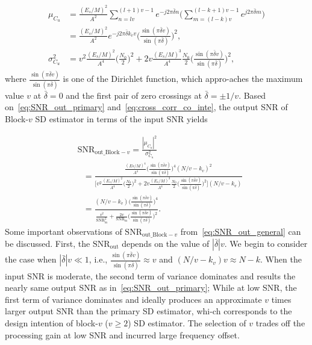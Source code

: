 \begin{equation}
  \begin{aligned}
  \label{eq:cross_corr_co_inte}
  \mu_{C_u}&=\frac{(E_s/M)^2}{A^2}\sum_{n=lv}^{(l+1)v-1}e^{-j2\pi \bar{\delta}n}\Bigg(\sum_{m=(l-k)v}^{(l-k+1)v-1}e^{j2\pi \bar{\delta}m}\Bigg) \\
  &=\frac{(E_s/M)^2}{A^2}e^{-j2\pi \bar{\delta}k_vv}\Bigg(\frac{\sin(\pi \bar{\delta}v)}{\sin(\pi \bar{\delta})}\Bigg)^2, \\
  \sigma^2_{C_u}&=v^2\frac{(E_s/M)^2}{A^4}\Big(\frac{N_0}{2}\Big)^2+2v\frac{(E_s/M)^3}{A^4}\frac{N_0}{2}\Bigg(\frac{\sin(\pi \bar{\delta}v)}{\sin(\pi \bar{\delta})}\Bigg)^2,
\end{aligned}
\end{equation}
where $\frac{\sin(\pi \bar{\delta}v)}{\sin(\pi \bar{\delta})}$ is one of the Dirichlet function, which appro-aches the maximum value $v$ at $\bar{\delta}=0$ and the first pair of zero crossings at
$\bar{\delta}=\pm 1/v$. Based on~\eqref{eq:SNR_out_primary} and~\eqref{eq:cross_corr_co_inte}, 
the output SNR of Block-$v$ SD estimator in terms of the input SNR yields

\begin{equation}
  \begin{aligned}
    \label{eq:SNR_out_general}
    &\text{SNR}_{\text{out\_Block}-v}=\frac{|\mu_{C_u}|^2}{\sigma^2_{C_u}} \\
    &~~~=\frac{\frac{(Es/M)^4}{A^4}\Big(\frac{\sin(\pi \bar{\delta}v)}{\sin(\pi \bar{\delta})}\Big)^4(N/v-k_v)^2}
    {\Big[v^2\frac{(E_s/M)^2}{A^4}\Big(\frac{N_0}{2}\Big)^2+2v\frac{(E_s/M)^3}{A^4}\frac{N_0}{2}\Big(\frac{\sin(\pi \bar{\delta}v)}{\sin(\pi \bar{\delta})}\Big)^2\Big](N/v{-}k_v)} \\
    &~~~=\frac{(N/v-k_v)\Big(\frac{\sin(\pi \bar{\delta}v)}{\sin(\pi \bar{\delta})}\Big)^4}
    {\frac{v^2}{\text{SNR}_{\text{in}}^2}+\frac{2v}{\text{SNR}_{\text{in}}}\Big(\frac{\sin(\pi \bar{\delta}v)}{\sin(\pi \bar{\delta})}\Big)^2}.
  \end{aligned}
\end{equation}
Some important observations of $\text{SNR}_{\text{out\_Block}-v}$ from~\eqref{eq:SNR_out_general} can be discussed. 
  First, the $\text{SNR}_{\text{out}}$ depends on the value of $|\bar{\delta}|v$.
We begin to consider the case when $|\bar{\delta}|v\ll1$, i.e., $\frac{\sin(\pi \bar{\delta}v)}{\sin(\pi \bar{\delta})} \approx v$
and $(N/v-k_v)v \approx N-k$.
When the input SNR is moderate, the second term of variance dominates and results the nearly same output SNR as in~\eqref{eq:SNR_out_primary};
While at low SNR, the first term of variance dominates and ideally produces an approximate $v$ times larger output SNR than the primary SD estimator,
whi-ch corresponds to the design intention of block-$v$ ($v \geq 2$) SD estimator.
The selection of $v$ trades off the processing gain at low SNR and incurred large frequency offset.

